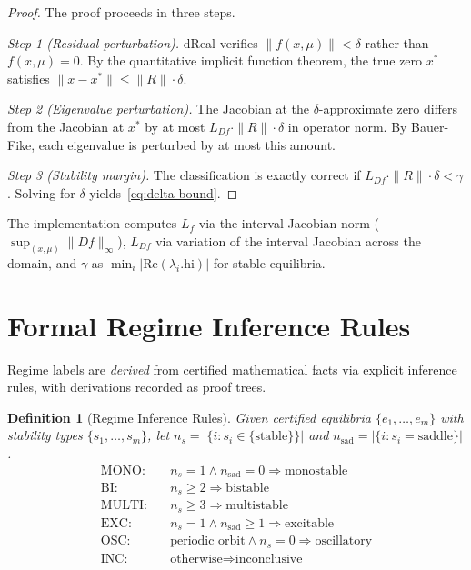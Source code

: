 \documentclass[11pt]{article}
\newtheorem{definition}[theorem]{Definition}
\newcommand{\norm}[1]{\|#1\|}
\begin{document}
\begin{proof}
The proof proceeds in three steps.

\emph{Step 1 (Residual perturbation).}
dReal verifies $\norm{f(x, \mu)} < \delta$ rather than $f(x,\mu) = 0$.
By the quantitative implicit function theorem, the true zero $x^*$ satisfies $\norm{x - x^*} \leq \norm{R} \cdot \delta$.

\emph{Step 2 (Eigenvalue perturbation).}
The Jacobian at the $\delta$-approximate zero differs from the Jacobian at $x^*$ by at most $L_{Df} \cdot \norm{R} \cdot \delta$ in operator norm.
By Bauer-Fike, each eigenvalue is perturbed by at most this amount.

\emph{Step 3 (Stability margin).}
The classification is exactly correct if $L_{Df} \cdot \norm{R} \cdot \delta < \gamma$.
Solving for $\delta$ yields~\eqref{eq:delta-bound}.
\end{proof}

The implementation computes $L_f$ via the interval Jacobian norm ($\sup_{(x,\mu)} \norm{Df}_\infty$), $L_{Df}$ via variation of the interval Jacobian across the domain, and $\gamma$ as $\min_i |\mathrm{Re}(\lambda_i.\mathrm{hi})|$ for stable equilibria.

\section{Formal Regime Inference Rules}
\label{sec:regime}

Regime labels are \emph{derived} from certified mathematical facts via explicit inference rules, with derivations recorded as proof trees.

\begin{definition}[Regime Inference Rules]
Given certified equilibria $\{e_1, \ldots, e_m\}$ with stability types $\{s_1, \ldots, s_m\}$, let $n_s = |\{i : s_i \in \{\text{stable}\}\}|$ and $n_{\mathrm{sad}} = |\{i : s_i = \text{saddle}\}|$.
\begin{align*}
\text{MONO:} &\quad n_s = 1 \wedge n_{\mathrm{sad}} = 0 \Rightarrow \text{monostable} \\
\text{BI:}   &\quad n_s \geq 2 \Rightarrow \text{bistable} \\
\text{MULTI:}&\quad n_s \geq 3 \Rightarrow \text{multistable} \\
\text{EXC:}  &\quad n_s = 1 \wedge n_{\mathrm{sad}} \geq 1 \Rightarrow \text{excitable} \\
\text{OSC:}  &\quad \text{periodic orbit} \wedge n_s = 0 \Rightarrow \text{oscillatory} \\
\text{INC:}  &\quad \text{otherwise} \Rightarrow \text{inconclusive}
\end{align*}
\end{definition}
\end{document}
